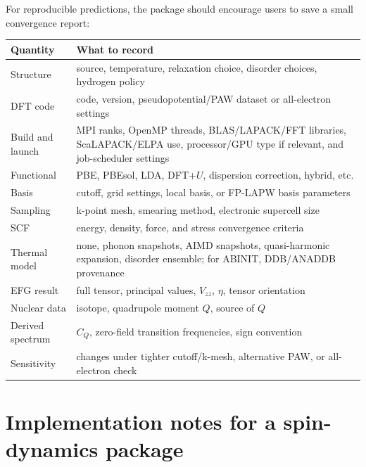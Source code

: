 \documentclass[11pt]{article}
\newcommand{\CQ}{C_Q}
\newcommand{\Vzz}{V_{zz}}
\newcommand{\etaEFG}{\eta}
\begin{document}
For reproducible predictions, the package should encourage users to save a small convergence report:
\begin{center}
\small
\begin{tabularx}{\textwidth}{@{}L{0.23\textwidth}Y@{}}
\toprule
\textbf{Quantity} & \textbf{What to record} \\
\midrule
Structure & source, temperature, relaxation choice, disorder choices, hydrogen policy \\
DFT code & code, version, pseudopotential/PAW dataset or all-electron settings \\
Build and launch & MPI ranks, OpenMP threads, BLAS/LAPACK/FFT libraries, ScaLAPACK/ELPA use, processor/GPU type if relevant, and job-scheduler settings \\
Functional & PBE, PBEsol, LDA, DFT+$U$, dispersion correction, hybrid, etc. \\
Basis & cutoff, grid settings, local basis, or FP-LAPW basis parameters \\
Sampling & k-point mesh, smearing method, electronic supercell size \\
SCF & energy, density, force, and stress convergence criteria \\
Thermal model & none, phonon snapshots, AIMD snapshots, quasi-harmonic expansion, disorder ensemble; for ABINIT, DDB/ANADDB provenance \\
EFG result & full tensor, principal values, $\Vzz$, $\etaEFG$, tensor orientation \\
Nuclear data & isotope, quadrupole moment $Q$, source of $Q$ \\
Derived spectrum & $\CQ$, zero-field transition frequencies, sign convention \\
Sensitivity & changes under tighter cutoff/k-mesh, alternative PAW, or all-electron check \\
\bottomrule
\end{tabularx}
\end{center}

\section{Implementation notes for a spin-dynamics package}
\end{document}
